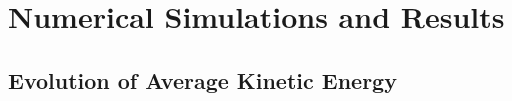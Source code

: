\chapter{Numerical Simulations and Results}
\section{Evolution of Average Kinetic Energy}
\section{}